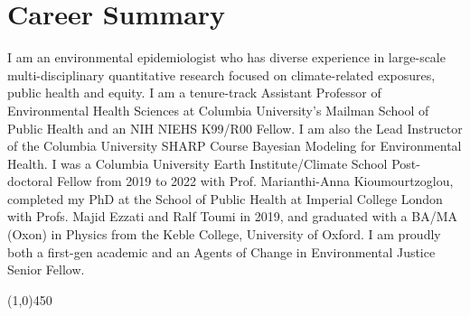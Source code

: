 \section*{Career Summary}

I am an environmental epidemiologist who has diverse experience in large-scale multi-disciplinary quantitative research focused on climate-related exposures, public health and equity. I am a tenure-track Assistant Professor of Environmental Health Sciences at Columbia University's Mailman School of Public Health and an NIH NIEHS K99/R00 Fellow. I am also the Lead Instructor of the Columbia University SHARP Course Bayesian Modeling for Environmental Health. I was a Columbia University Earth Institute/Climate School Post-doctoral Fellow from 2019 to 2022 with Prof. Marianthi-Anna Kioumourtzoglou, completed my PhD at the School of Public Health at Imperial College London with Profs. Majid Ezzati and Ralf Toumi in 2019, and graduated with a BA/MA (Oxon) in Physics from the Keble College, University of Oxford. I am proudly both a first-gen academic and an Agents of Change in Environmental Justice Senior Fellow.

\begin{center} \line(1,0){450} \end{center}